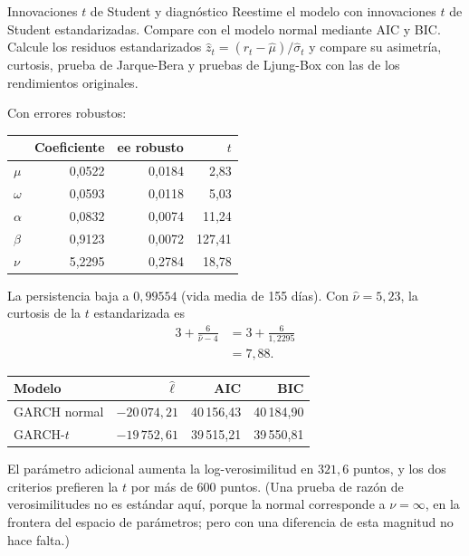 \begin{ejresuelto}{Innovaciones $t$ de Student y diagnóstico}\label{ej:garcht}
\enunciado Reestime el modelo con innovaciones $t$ de Student estandarizadas. Compare con el modelo normal
mediante AIC y BIC. Calcule los residuos estandarizados $\hat z_t=(r_t-\hat\mu)/\hat\sigma_t$ y compare su
asimetría, curtosis, prueba de Jarque-Bera y pruebas de Ljung-Box con las de los rendimientos originales.

\solucion
{} Con errores robustos:
\begin{center}\small
\begin{tabular}{@{}lrrr@{}}
\toprule
 & Coeficiente & ee robusto & $t$ \\
\midrule
$\mu$    & 0,0522 & 0,0184 & 2,83 \\
$\omega$ & 0,0593 & 0,0118 & 5,03 \\
$\alpha$ & 0,0832 & 0,0074 & 11,24 \\
$\beta$  & 0,9123 & 0,0072 & 127,41 \\
$\nu$    & 5,2295 & 0,2784 & 18,78 \\
\bottomrule
\end{tabular}
\end{center}
La persistencia baja a $0{,}99554$ (vida media de 155 días). Con $\hat\nu=5{,}23$, la curtosis de la $t$
estandarizada es
\begin{align*}
  3+\frac{6}{\hat\nu-4} &= 3+\frac{6}{1{,}2295}\\
                        &= 7{,}88 .
\end{align*}

\begin{center}\small
\begin{tabular}{@{}lrrr@{}}
\toprule
Modelo & $\hat\ell$ & AIC & BIC \\
\midrule
GARCH normal & $-20\,074{,}21$ & 40\,156,43 & 40\,184,90 \\
GARCH-$t$    & $-19\,752{,}61$ & 39\,515,21 & 39\,550,81 \\
\bottomrule
\end{tabular}
\end{center}
El parámetro adicional aumenta la log-verosimilitud en $321{,}6$ puntos, y los dos criterios prefieren la $t$
por más de 600 puntos. (Una prueba de razón de verosimilitudes no es estándar aquí, porque la normal
corresponde a $\nu=\infty$, en la frontera del espacio de parámetros; pero con una diferencia de esta
magnitud no hace falta.)


\end{ejresuelto}
